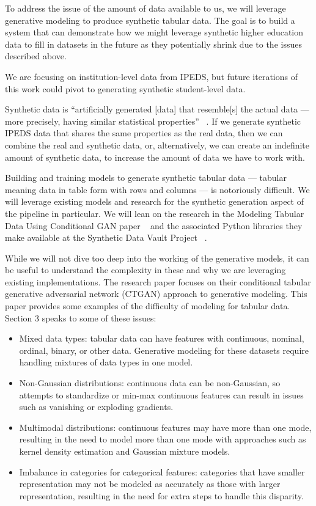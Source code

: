 \documentclass[sigconf, authorversion, nonacm]{acmart}
\begin{document}
   To address the issue of the amount of data available to us, we will leverage generative modeling to produce synthetic tabular data. The goal is to build a system that can demonstrate how we might leverage synthetic higher education data to fill in datasets in the future as they potentially shrink due to the issues described above.

    We are focusing on institution-level data from IPEDS, but future iterations of this work could pivot to generating synthetic student-level data.

    Synthetic data is ``artificially generated [data] that resemble[s] the actual data --- more precisely, having similar statistical properties'' ~\cite[p. 1]{decristofaro2024syntheticdatamethodsuse}. If we generate synthetic IPEDS data that shares the same properties as the real data, then we can combine the real and synthetic data, or, alternatively, we can create an indefinite amount of synthetic data, to increase the amount of data we have to work with.

    Building and training models to generate synthetic tabular data --- tabular meaning data in table form with rows and columns --- is notoriously difficult. We will leverage existing models and research for the synthetic generation aspect of the pipeline in particular. We will lean on the research in the Modeling Tabular Data Using Conditional GAN paper ~\cite{DBLP:journals/corr/abs-1907-00503} and the associated Python libraries they make available at the Synthetic Data Vault Project ~\cite{sdv}.

    While we will not dive too deep into the working of the generative models, it can be useful to understand the complexity in these and why we are leveraging existing implementations. The research paper focuses on their conditional tabular generative adversarial network (CTGAN) approach to generative modeling. This paper provides some examples of the difficulty of modeling for tabular data. Section 3 speaks to some of these issues:

    \begin{itemize}
        \item Mixed data types: tabular data can have features with continuous, nominal, ordinal, binary, or other data. Generative modeling for these datasets require handling mixtures of data types in one model.
        \item Non-Gaussian distributions: continuous data can be non-Gaussian, so attempts to standardize or min-max continuous features can result in issues such as vanishing or exploding gradients.
        \item Multimodal distributions: continuous features may have more than one mode, resulting in the need to model more than one mode with approaches such as kernel density estimation and Gaussian mixture models.
        \item Imbalance in categories for categorical features: categories that have smaller representation may not be modeled as accurately as those with larger representation, resulting in the need for extra steps to handle this disparity. \cite{DBLP:journals/corr/abs-1907-00503}
    \end{itemize}
\end{document}
